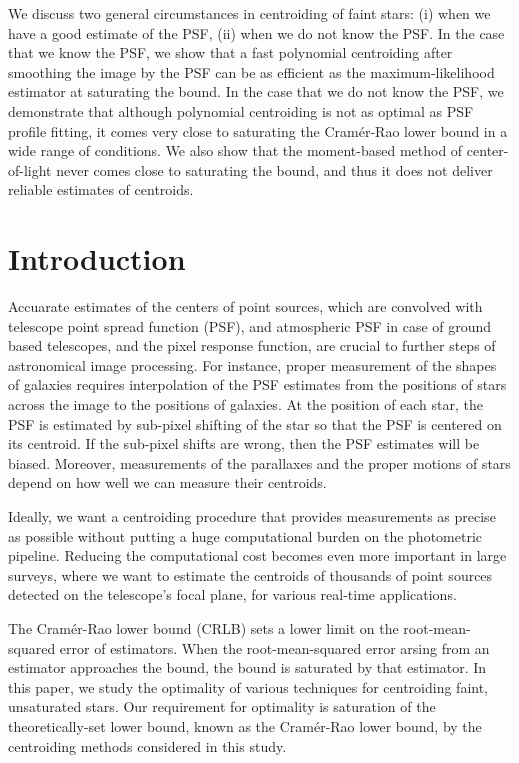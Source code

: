We discuss two general circumstances in centroiding of faint stars: (i) when we have a good estimate
of the PSF, (ii) when we do not know the PSF. In the case that we know the PSF, 
we show that a fast polynomial centroiding after smoothing the image by the PSF can be 
as efficient as the maximum-likelihood estimator at saturating the bound. 
In the case that we do not know the PSF, we demonstrate that although polynomial centroiding is not as optimal as PSF profile fitting, it comes very close to saturating the Cram\'{e}r-Rao lower bound in a wide range of conditions. We also show that the moment-based method of center-of-light 
never comes close to saturating the bound, and thus it does not deliver reliable estimates of centroids.  

\section{Introduction}

Accuarate estimates of the centers of point sources, which are convolved with telescope point spread function (PSF), and atmospheric PSF in case of ground based telescopes, and the pixel response function, are crucial to further steps of
astronomical image processing. For instance, proper measurement of the shapes of galaxies
requires interpolation of the PSF estimates from the positions of stars across the
image to the positions of galaxies. At the position of each star, the PSF is estimated by sub-pixel 
shifting of the star so that the PSF is centered on its centroid. If the sub-pixel shifts are wrong, then 
the PSF estimates will be biased. Moreover, measurements of the parallaxes and the proper motions of stars
depend on how well we can measure their centroids. 

Ideally, we want a centroiding procedure that provides measurements as precise 
as possible without putting a huge computational burden on the photometric pipeline.
Reducing the computational cost becomes even more important in large surveys,
where we want to estimate the centroids of thousands of point sources detected
on the telescope's focal plane, for various real-time applications. 

The Cram\'{e}r-Rao lower bound (CRLB) sets a lower limit on the root-mean-squared error of estimators. When the root-mean-squared error arsing from an estimator approaches the bound, the bound is saturated by that estimator. In this paper, we study the optimality of various techniques for centroiding faint, unsaturated stars. Our requirement for optimality is saturation of the 
theoretically-set lower bound, known as the Cram\'{e}r-Rao lower bound, by the 
centroiding methods considered in this study. 

